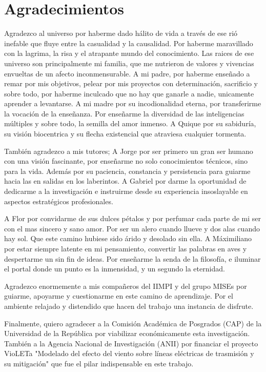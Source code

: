 \chapter*{Agradecimientos}

Agradezco al universo por haberme dado hálito de vida a través de ese rió inefable que fluye entre la casualidad y la causalidad. Por haberme maravillado con la lagrima, la risa y el atrapante mundo del conocimiento. Las raices de ese universo son principalmente mi familia, que me nutrieron de valores y vivencias envueltas de un afecto inconmensurable. A mi padre, por haberme enseñado a remar por mis objetivos, pelear por mis proyectos con determinación, sacrificio y sobre todo, por haberme inculcado que no hay que ganarle a nadie, unicamente aprender a levantarse. A mi madre por su incodionalidad eterna, por transferirme la vocación de la enseñanza. Por enseñarme la diversidad de las inteligencias múltiples y sobre todo, la semilla del amor inmenso. A Quique por su sabiduría, su visión biocentrica y su flecha existencial que atraviesa cualquier tormenta. 

También agradezco a mis tutores; A Jorge por ser primero un gran ser humano con una visión fascinante, por enseñarme no solo conocimientos técnicos, sino para la vida. Además por su paciencia, constancia y persistencia para guiarme hacia las en salidas en los laberintos. A Gabriel por darme la oportunidad de dedicarme a la investigación e instruirme desde su experiencia insoslayable en aspectos estratégicos profesionales.   

A Flor por convidarme de sus dulces pétalos y por perfumar cada parte de mi ser con el mas sincero y sano amor. Por ser un alero cuando llueve y dos alas cuando hay sol. Que este camino hubiese sido árido y desolado sin ella. A Máximiliano por estar siempre latente en mi pensamiento, convertir las palabras en aves y despertarme un sin fin de ideas. Por enseñarme la senda de la filosofía, e iluminar el portal donde un punto es la inmensidad, y un segundo la eternidad.

Agradezco enormemente a mis compañeros del IIMPI y del grupo MISEs por guiarme, apoyarme y cuestionarme en este camino de aprendizaje. Por el ambiente relajado y distendido que hacen del trabajo una instancia de disfrute.

Finalmente, quiero agradecer a la Comisión Académica de Posgrados (CAP) de la Universidad de la República por viabilizar económicamente esta investigación. También a la Agencia Nacional de Investigación (ANII) por financiar el proyecto VioLETa "Modelado del efecto del viento sobre líneas eléctricas de  trasmisión y su mitigación" que fue el pilar indispensable en este trabajo.